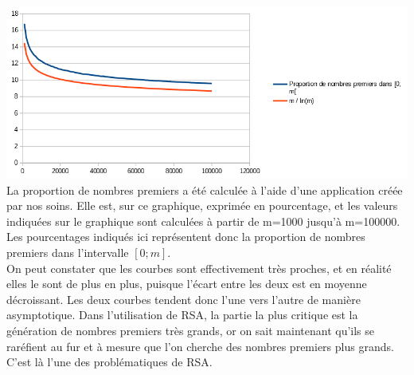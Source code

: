 		\includegraphics{prop_premier.png}
		La proportion de nombres premiers a été calculée à l'aide d'une application créée par nos soins. Elle est, sur ce graphique, exprimée en pourcentage, et les valeurs indiquées sur le graphique sont calculées à partir de m=1000 jusqu'à m=100000. Les pourcentages indiqués ici représentent donc la proportion de nombres premiers dans l'intervalle $[0; m]$.\\
		On peut constater que les courbes sont effectivement très proches, et en réalité elles le sont de plus en plus, puisque l'écart entre les deux est en moyenne décroissant. Les deux courbes tendent donc l'une vers l'autre de manière asymptotique.
		Dans l'utilisation de RSA, la partie la plus critique est la génération de nombres premiers très grands, or on sait maintenant qu'ils se raréfient au fur et à mesure que l'on cherche des nombres premiers plus grands. C'est là l'une des problématiques de RSA.